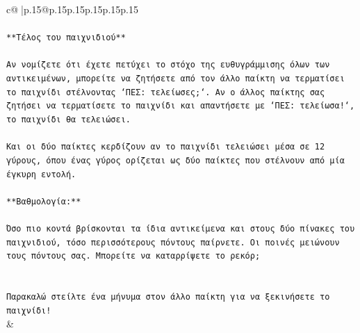 \documentclass{article}
\begin{document}
{\begin{supertabular}{c@{$\;$}|p{.15\linewidth}@{}p{.15\linewidth}p{.15\linewidth}p{.15\linewidth}p{.15\linewidth}p{.15\linewidth}}
{{{\\ 
\\ 
\texttt{**Τέλος του παιχνιδιού**} \\
\\ 
\texttt{Αν νομίζετε ότι έχετε πετύχει το στόχο της ευθυγράμμισης όλων των αντικειμένων, μπορείτε να ζητήσετε από τον άλλο παίκτη να τερματίσει το παιχνίδι στέλνοντας `ΠΕΣ: τελείωσες;`. Αν ο άλλος παίκτης σας ζητήσει να τερματίσετε το παιχνίδι και απαντήσετε με `ΠΕΣ: τελείωσα!`, το παιχνίδι θα τελειώσει.} \\
\\ 
\texttt{Και οι δύο παίκτες κερδίζουν αν το παιχνίδι τελειώσει μέσα σε 12 γύρους, όπου ένας γύρος ορίζεται ως δύο παίκτες που στέλνουν από μία έγκυρη εντολή.} \\
\\ 
\texttt{**Βαθμολογία:**} \\
\\ 
\texttt{Όσο πιο κοντά βρίσκονται τα ίδια αντικείμενα και στους δύο πίνακες του παιχνιδιού, τόσο περισσότερους πόντους παίρνετε. Οι ποινές μειώνουν τους πόντους σας. Μπορείτε να καταρρίψετε το ρεκόρ;} \\
\\ 
\\ 
\texttt{Παρακαλώ στείλτε ένα μήνυμα στον άλλο παίκτη για να ξεκινήσετε το παιχνίδι!} \\
            }
        }
    }
    & \\ \\


\end{supertabular}}
\end{document}
